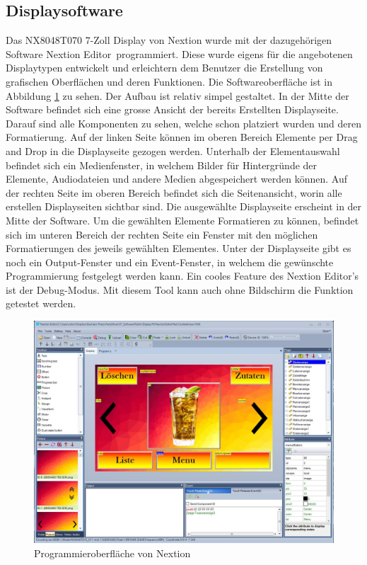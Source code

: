 \subsection{Displaysoftware}
\label{subsec:Software_Display}

Das NX8048T070 7-Zoll Display von Nextion wurde mit der dazugehörigen Software \flqq Nextion Editor\frqq~programmiert. Diese wurde eigens für die angebotenen Displaytypen entwickelt und erleichtern dem Benutzer die Erstellung von grafischen Oberflächen und deren Funktionen. Die Softwareoberfläche ist in Abbildung \ref{fig:NextionEditor} zu sehen. Der Aufbau ist relativ simpel gestaltet. In der Mitte der Software befindet sich eine grosse Ansicht der bereits Erstellten Displayseite. Darauf sind alle Komponenten zu sehen, welche schon platziert wurden und deren Formatierung. Auf der linken Seite können im oberen Bereich Elemente per Drag and Drop in die Displayseite gezogen werden. Unterhalb der Elementauswahl befindet sich ein Medienfenster, in welchem Bilder für Hintergründe der Elemente, Audiodateien und andere Medien abgespeichert werden können. Auf der rechten Seite im oberen Bereich befindet sich die Seitenansicht, worin alle erstellen Displayseiten sichtbar sind. Die ausgewählte Displayseite erscheint in der Mitte der Software. Um die gewählten Elemente Formatieren zu können, befindet sich im unteren Bereich der rechten Seite ein Fenster mit den möglichen Formatierungen des jeweils gewählten Elementes. Unter der Displayseite gibt es noch ein Output-Fenster und ein Event-Fenster, in welchem die gewünschte Programmierung festgelegt werden kann. Ein cooles Feature des Nextion Editor's ist der Debug-Modus. Mit diesem Tool kann auch ohne Bildschirm die Funktion getestet werden. \cite{patrick_nx8048t070_nodate} \cite{zhou_nextion_nodate}

\begin{figure}[h!]
	\centering
	\includegraphics[width=\textwidth]{graphics/NextionEditor}
	\caption{Programmieroberfläche von Nextion \cite{zhou_nextion_nodate} \cite{pngimgcom_cocktail_nodate-7}}
	\label{fig:NextionEditor}
\end{figure}

\newpage
 


